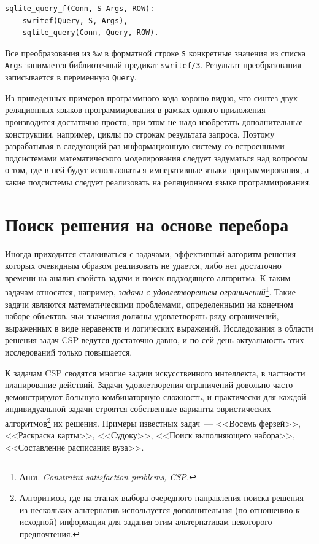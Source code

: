 \documentclass[a4paper,14pt, openany, twoside, draft]{extbook} %
\newcommand{\nnn}[2][ncolor]{\noindent%
\textcolor{eclr}{!\ [}\textcolor{#1}{#2}\textcolor{eclr}{]}}
\begin{document}
\begin{verbatim}
sqlite_query_f(Conn, S-Args, ROW):-
    swritef(Query, S, Args),
    sqlite_query(Conn, Query, ROW).
\end{verbatim}

Все преобразования из \texttt{\%w} в форматной строке \texttt{S} конкретные значения из списка \texttt{Args} занимается библиотечный предикат \texttt{swritef/3}.  Результат преобразования записывается в переменную \texttt{Query}.

Из приведенных примеров программного кода хорошо видно, что синтез двух реляционных языков программирования в рамках одного приложения производится достаточно просто, при этом не надо изобретать дополнительные конструкции, например, циклы по строкам результата запроса.  Поэтому разрабатывая в следующий раз информационную систему со встроенными подсистемами математического моделирования \cite{asya2008} следует задуматься над вопросом о том, где в ней будут использоваться императивные языки программирования, а какие подсистемы следует реализовать на реляционном языке программирования.



\section{Поиск решения на основе перебора} \label{sec:britmuseum}

Иногда приходится сталкиваться с задачами, эффективный алгоритм решения которых очевидным образом реализовать не удается, либо нет достаточно времени на анализ свойств задачи и поиск подходящего алгоритма. К таким задачам относятся, например, \emph{задачи с удовлетворением ограничений}\footnote{Англ. \emph{\foreignlanguage{english}{Constraint satisfaction problems}, CSP.}}. Такие задачи являются математическими проблемами, определенными на конечном наборе объектов, чьи значения должны удовлетворять ряду ограничений, выраженных в виде неравенств и логических выражений. Исследования в области решения задач CSP ведутся достаточно давно, и по сей день актуальность этих исследований только повышается.

К задачам CSP сводятся многие задачи искусственного интеллекта, в частности планирование действий. Задачи удовлетворения ограничений довольно часто демонстрируют большую комбинаторную сложность, и практически для каждой индивидуальной задачи строятся собственные варианты эвристических алгоритмов\footnote{Алгоритмов, где на этапах выбора очередного направления поиска решения из нескольких альтернатив используется дополнительная (по отношению к исходной) информация для задания этим альтернативам некоторого предпочтения.} их решения. Примеры известных задач~--- <<Восемь ферзей>>, <<Раскраска карты>>, <<Судоку>>, <<Поиск выполняющего набора>>, <<Составление расписания вуза>>.
\end{document}

